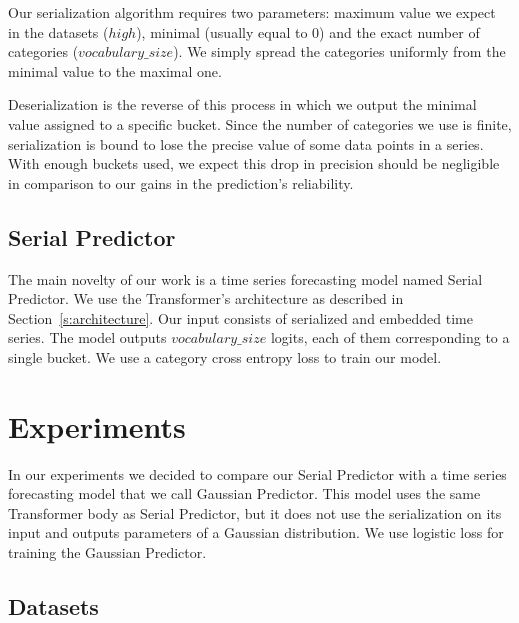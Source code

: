 \documentclass[en]{pracamgr}
\begin{document}
Our serialization algorithm requires two parameters: maximum value we expect in the datasets ($high$), minimal (usually equal to 0) and the exact number of categories ($vocabulary\_size$).
We simply spread the categories uniformly from the minimal value to the maximal one. 

Deserialization is the reverse of this process in which we output the minimal value assigned to a specific bucket. Since the number of categories we use is finite, serialization is bound to lose the precise value of some data points in a series. With enough buckets used, we expect this drop in precision should be negligible in comparison to our gains in the prediction's reliability.

\section{Serial Predictor}
The main novelty of our work is a time series forecasting model named Serial Predictor.
We use the Transformer's architecture as described in Section~\ref{s:architecture}. Our input consists of serialized and embedded time series. The model outputs $vocabulary\_size$ logits, each of them corresponding to a single bucket. We use a category cross entropy loss to train our model.



\chapter{Experiments}

In our experiments we decided to compare our Serial Predictor with a time series forecasting model that we call Gaussian Predictor. This model uses the same Transformer body as Serial Predictor, but it does not use the serialization on its input and outputs parameters of a Gaussian distribution. We use logistic loss for training the Gaussian Predictor.

\section{Datasets}
\end{document}
